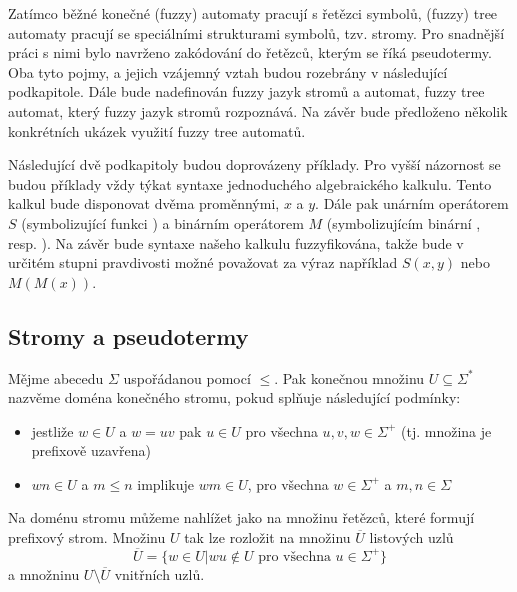 \documentclass[a4paper,10pt]{article}
\begin{document}
Zatímco běžné konečné (fuzzy) automaty pracují s řetězci symbolů, (fuzzy) tree automaty pracují se speciálními strukturami symbolů, tzv. stromy. Pro snadnější práci s nimi bylo navrženo zakódování do řetězců, kterým se říká pseudotermy. Oba tyto pojmy, a jejich vzájemný vztah budou rozebrány v následující podkapitole. Dále bude nadefinován fuzzy jazyk stromů a automat, fuzzy tree automat, který fuzzy jazyk stromů rozpoznává. Na závěr bude předloženo několik konkrétních ukázek využití fuzzy tree automatů.

Následující dvě podkapitoly budou doprovázeny příklady. Pro vyšší názornost se budou příklady vždy týkat syntaxe jednoduchého algebraického kalkulu. Tento kalkul bude disponovat dvěma proměnnými, $x$ a $y$. Dále pak unárním operátorem $S$ (symbolizující funkci ) a binárním operátorem $M$ (symbolizujícím binární , resp. ). Na závěr bude syntaxe našeho kalkulu fuzzyfikována, takže bude v určitém stupni pravdivosti možné považovat za výraz například $S(x, y)$ nebo $M(M(x))$.

\subsection{Stromy a pseudotermy}

\begin{definition}
  Mějme abecedu $\Sigma$ uspořádanou pomocí $\leq$. Pak konečnou množinu $U \subseteq \Sigma^*$ nazvěme doména konečného stromu, pokud splňuje následující podmínky:
  \begin{itemize}
   \item jestliže $w \in U$ a $w = uv$ pak $u \in U$ pro všechna $u, v, w \in \Sigma^+$ (tj. množina je prefixově uzavřena)
   \item $wn \in U$ a $m \leq n$ implikuje $wm \in U$, pro všechna $w \in \Sigma^+$ a $m, n \in \Sigma$
  \end{itemize}
\end{definition}
 Na doménu stromu můžeme nahlížet jako na množinu řetězců, které formují prefixový strom. Množinu $U$ tak lze rozložit na množinu $\overline{U}$ listových uzlů 
$$
 \overline{U} = \{ w \in U | w u \notin U \text{ pro všechna } u \in \Sigma^+ \}
$$
a množninu $U \setminus \overline{U}$ vnitřních uzlů.
\end{document}
